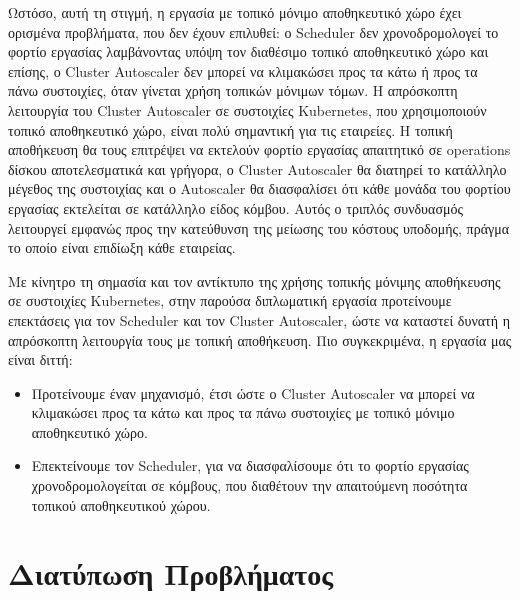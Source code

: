 Ωστόσο, αυτή τη στιγμή, η εργασία με τοπικό μόνιμο αποθηκευτικό χώρο έχει ορισμένα προβλήματα,
που δεν έχουν επιλυθεί: ο Scheduler δεν χρονοδρομολογεί το
φορτίο εργασίας λαμβάνοντας υπόψη τον διαθέσιμο τοπικό αποθηκευτικό χώρο και
επίσης, ο Cluster Autoscaler δεν μπορεί να κλιμακώσει προς τα κάτω ή προς τα
πάνω συστοιχίες, όταν γίνεται χρήση τοπικών μόνιμων τόμων. Η απρόσκοπτη
λειτουργία του Cluster Autoscaler σε συστοιχίες Kubernetes, που χρησιμοποιούν
τοπικό αποθηκευτικό χώρο, είναι πολύ σημαντική για τις εταιρείες. Η τοπική
αποθήκευση θα τους επιτρέψει να εκτελούν φορτίο εργασίας απαιτητικό σε
operations δίσκου αποτελεσματικά και γρήγορα, ο Cluster Autoscaler θα διατηρεί
το κατάλληλο μέγεθος της συστοιχίας και ο Autoscaler θα διασφαλίσει ότι κάθε
μονάδα του φορτίου εργασίας εκτελείται σε κατάλληλο είδος κόμβου. Αυτός ο τριπλός
συνδυασμός λειτουργεί εμφανώς προς την κατεύθυνση της μείωσης του κόστους
υποδομής, πράγμα το οποίο είναι επιδίωξη κάθε εταιρείας.

Με κίνητρο τη σημασία και τον αντίκτυπο της χρήσης τοπικής μόνιμης αποθήκευσης
σε συστοιχίες Kubernetes, στην παρούσα διπλωματική εργασία προτείνουμε επεκτάσεις για τον
Scheduler και τον Cluster Autoscaler, ώστε να καταστεί δυνατή η απρόσκοπτη
λειτουργία τους με τοπική αποθήκευση. Πιο συγκεκριμένα, η εργασία μας είναι
διττή:

\begin{itemize}
      \item Προτείνουμε έναν μηχανισμό, έτσι ώστε ο Cluster Autoscaler να μπορεί
            να κλιμακώσει προς τα κάτω και προς τα πάνω συστοιχίες με
            τοπικό μόνιμο αποθηκευτικό χώρο.
      \item Επεκτείνουμε τον Scheduler, για να διασφαλίσουμε ότι το φορτίο
            εργασίας χρονοδρομολογείται σε κόμβους, που διαθέτουν την απαιτούμενη
            ποσότητα τοπικού αποθηκευτικού χώρου.
\end{itemize}

\section{Διατύπωση Προβλήματος} \label{section:gr-intro_problem_statement}

